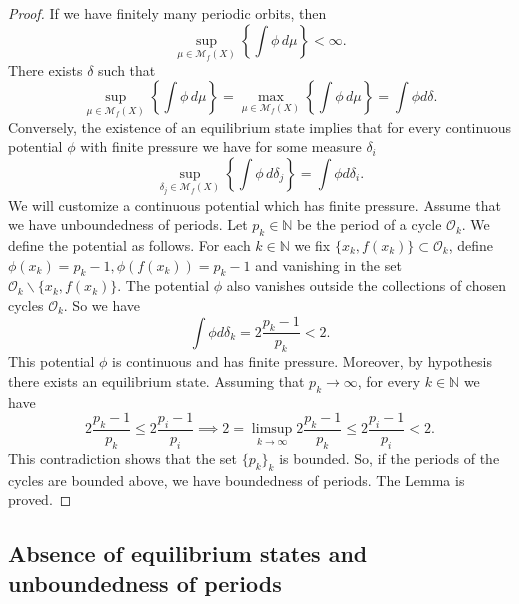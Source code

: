 \documentclass[12 pt]{amsart}
\theoremstyle{definition}
\begin{document}
\begin{proof}
		If we have finitely many periodic orbits, then
		\[
		\sup_{\mu \in \mathcal{M}_{f}(X)} \left\{ \int \phi \, d\mu \right\} < \infty.
		\]
		There exists $\delta$ such that
		\[
		\sup_{\mu \in \mathcal{M}_{f}(X)} \left\{ \int \phi \, d\mu \right\} =
		\max_{\mu \in \mathcal{M}_{f}(X)} \left\{ \int \phi \, d\mu \right\} = \int \phi d\delta .
		\]
		Conversely, the existence of an equilibrium state implies that for every continuous potential $\phi$ with finite pressure we have for some measure $\delta_{i}$
		\[
		\sup_{\delta_{j} \in \mathcal{M}_{f}(X)} \left\{ \int \phi \, d\delta_{j} \right\} = \int \phi d\delta_{i}.
		\]
		We will customize a continuous potential which has finite pressure. Assume that we have unboundedness of periods. Let $p_{k} \in \mathbb{N}$ be the period of a cycle $\mathcal{O}_{k}$. We define the potential as follows. For each $k \in \mathbb{N}$ we fix $\{x_{k}, f(x_{k})\} \subset \mathcal{O}_{k}$, define $\phi(x_{k}) = p_{k} - 1, \phi(f(x_{k})) = p_{k} - 1$ and vanishing in the set $\mathcal{O}_{k} \backslash \{x_{k}, f(x_{k})\}$. The potential $\phi$ also vanishes outside the collections of chosen cycles $\mathcal{O}_{k}$. So we have
		\[
		\int \phi d \delta_{k} = 2\frac{p_{k} - 1}{p_{k}} < 2. 
		\]
		This potential $\phi$ is continuous and has finite pressure. Moreover, by hypothesis there exists an equilibrium state. Assuming that $p_{k} \to \infty$, for every $k \in \mathbb{N}$ we have
		\[
		2\frac{p_{k} - 1}{p_{k}} \leq 2\frac{p_{i} - 1}{p_{i}} \implies 2 = \limsup_{k \to \infty} 2\frac{p_{k} - 1}{p_{k}} \leq 2\frac{p_{i} - 1}{p_{i}} < 2.
		\]
		This contradiction shows that the set $\{p_{k}\}_{k}$ is bounded. So, if the periods of the cycles are bounded above, we have boundedness of periods. The Lemma is proved.
	\end{proof}
	
     \subsection{Absence of equilibrium states and unboundedness of periods}   
   
\end{document}
